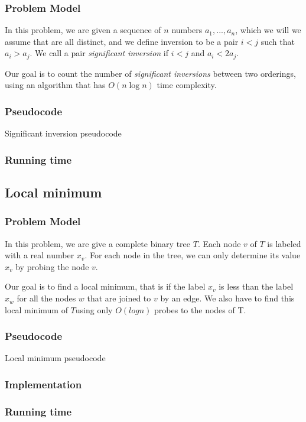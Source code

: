 \documentclass{article}
\begin{document}
\subsubsection*{Problem Model}

In this problem, we are given a sequence of $n$ numbers $a_1,...,a_n$, which we will we assume that are all distinct, and we define inversion to be a pair $i<j$ such that $a_i>a_j$. We call a pair \textit{significant inversion} if $i<j$ and $a_i<2a_j$.

Our goal is to count the number of \textit{significant inversions} between two orderings, using an algorithm that has $O(n \log n)$ time complexity.

\subsubsection*{Pseudocode}

\begin{algorithm}[H]
\caption{Significant inversion pseudocode}
\begin{algorithmic}[1]
\end{algorithmic}
\end{algorithm}

\subsubsection*{Running time}


\subsection*{Local minimum}

\subsubsection*{Problem Model}

In this problem, we are give a complete binary tree $T$. Each node $v$ of $T$ is labeled with a real number $x_v$. For each node in the tree, we can only determine its value $x_v$ by probing the node $v$.

Our goal is to find a local minimum, that is if the label $x_v$ is less than the label $x_w$ for all the nodes $w$ that are joined to $v$ by an edge.  We also have to find this local minimum of $T$using only $O(log n)$ probes to the nodes of T.

\subsubsection*{Pseudocode}

\begin{algorithm}[H]
\caption{Local minimum pseudocode}
\begin{algorithmic}[1]
\end{algorithmic}
\end{algorithm}

\subsubsection*{Implementation}

\subsubsection*{Running time}
\end{document}
